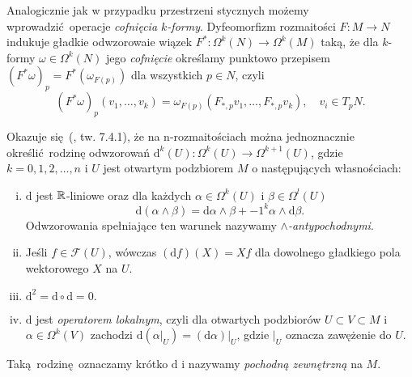 


Analogicznie jak w przypadku przestrzeni stycznych możemy wprowadzić operacje \emph{cofnięcia \(k\)-formy}. Dyfeomorfizm rozmaitości \(F:M\to N\) indukuje gładkie odwzorowaie wiązek \(F^\ast:\Omega^k(N)\to\Omega^{k}(M)\) taką, że dla \(k\)-formy \(\omega\in\Omega^k(N)\) jego \emph{cofnięcie} określamy punktowo przepisem \((F^\ast \omega)_p = F^\ast(\omega_{F(p)})\) dla wszystkich \(p\in N\), czyli
\begin{equation*}
    (F^\ast\omega)_p(v_1, \dots, v_k) = \omega_{F(p)}(F_{\ast,p}v_1, \dots, F_{\ast,p}v_k),\quad v_i\in T_p N.
\end{equation*}

Okazuje się (\cite{marsden}, tw. 7.4.1), że na n-rozmaitościach można jednoznacznie określić rodzinę odwzorowań \(\mathrm{d}^k(U): \Omega^k(U)\to \Omega^{k+1}(U)\), gdzie \(k=0, 1, 2, \dots, n\) i \(U\) jest otwartym podzbiorem \(M\) o następujących własnościach:
\begin{enumerate}[i)]
    \item \(\mathrm{d}\) jest \(\mathbb{R}\)-liniowe oraz dla każdych \(\alpha\in \Omega^k(U)\) i \(\beta\in \Omega^l(U)\)
        \begin{equation*}
                \mathrm{d}(\alpha \wedge \beta) = \mathrm{d}\alpha \wedge \beta + -1^k \alpha \wedge \mathrm{d}\beta.
        \end{equation*}
        Odwzorowania spełniające ten warunek nazywamy \emph{\(\wedge\)-antypochodnymi}.
    \item Jeśli \(f\in\mathcal{F}(U)\), wówczas \((\mathrm{d}f)(X)=Xf\) dla dowolnego gładkiego pola wektorowego \(X\) na \(U\).
    \item \(\mathrm{d^2} = \mathrm{d} \circ \mathrm{d} = 0.\)
    \item \(\mathrm{d}\) jest \emph{operatorem lokalnym}, czyli dla otwartych podzbiorów \(U \subset V \subset M\) i \(\alpha\in\Omega^k(V)\) zachodzi \(\mathrm{d}(\left.\alpha\right|_U)  = \left.(\mathrm{d}\alpha)\right|_U\), gdzie \(|_U\) oznacza zawężenie do \(U\).
\end{enumerate}
Taką rodzinę oznaczamy krótko \(\mathrm{d}\) i nazywamy \emph{pochodną zewnętrzną} na \(M\). 


